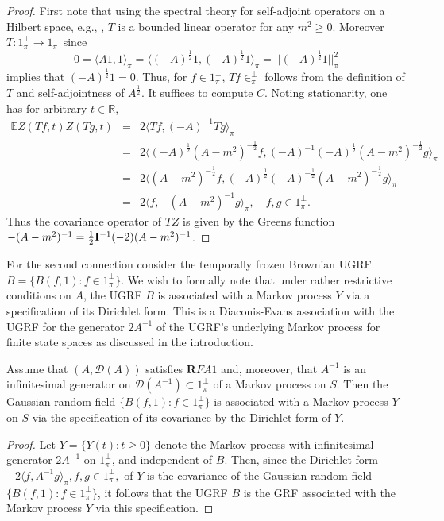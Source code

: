 \documentclass[11pt]{article}
\numberwithin{equation}{section}
\theoremstyle{definition}
\theoremstyle{remark}
\theoremstyle{definition}
\begin{document}
\begin{proof}
First note that using the spectral theory for 
self-adjoint operators on a Hilbert space, e.g., \cite{riesz},
$T$ is a bounded linear operator for any $m^2\ge 0$. Moreover $T:1_\pi^\perp\to1_\pi^\perp$ since 
\begin{equation}0 = \langle A1,1\rangle_\pi = \langle (-A)^{\frac{1}{2}}1,(-A)^{\frac{1}{2}}1\rangle_\pi =||(-A)^{\frac{1}{2}}1||_\pi^2\end{equation}
implies that $(-A)^{\frac{1}{2}}1=0$. Thus, for $f\in1_\pi^\perp$,
$Tf\in_\pi^\perp$ follows from the definition of $T$ and
self-adjointness of $A^{\frac{1}{2}}$.
It suffices to compute $C$. Noting stationarity,
one has for arbitrary $t\in\mathbb{R}$,
\begin{eqnarray}
\mathbb{E}Z(Tf,t)Z(Tg,t) &=& 2\langle Tf,(-A)^{-1}Tg\rangle_\pi\nonumber\\
&=& 2\langle (-A)^{\frac{1}{2}}(A-m^2)^{-\frac{1}{2}}f,(-A)^{-1}(-A)^{\frac{1}{2}}(A-m^2)^{-\frac{1}{2}}g\rangle_\pi\nonumber \\
&=& 2\langle (A-m^2)^{-\frac{1}{2}}f,(-A)^{\frac{1}{2}}(-A)^{-\frac{1}{2}}
(A-m^2)^{-\frac{1}{2}}g\rangle_\pi \nonumber\\
&=& 2\langle f,-(A-m^2)^{-1}g\rangle_\pi, \quad f,g\in1_\pi^\perp.
\end{eqnarray}
Thus the covariance operator of $TZ$ is given by
the Greens function $ -(A-m^2)^{-1} = \frac{1}{2}{\bf I}^{-1}(-2)(A-m^2)^{-1}
$.
\end{proof}


For the second connection consider the temporally frozen Brownian UGRF $B=\{B(f,1):f\in1_\pi^\perp\}$.
We wish to formally note that under rather restrictive conditions on $A$, the
UGRF $B$ is associated with a Markov
process $Y$ via a specification of its Dirichlet form. This is a Diaconis-Evans \cite{DiaconisEvans}
 association with the UGRF for the generator $2A^{-1}$ 
of the UGRF's underlying Markov process  for finite state spaces
 as discussed in the introduction. 

 \begin{thm}\label{dirformthm} Assume that $(A,\mathcal{D}(A))$ satisfies ${\mathbf RFA1}$ and, moreover,
 that $A^{-1}$  is an
  infinitesimal generator on ${\mathcal D}(A^{-1})\subset 1_\pi^\perp$ of
 a Markov process on $S$.  Then the Gaussian random field 
 $\{B(f,1):f\in1_\pi^\perp\}$ is associated  
  with a 
 Markov process $Y$ on $S$
 via the specification
 of its covariance by the Dirichlet form of $Y$.  \end{thm}
 \begin{proof}
 
Let 
$Y=\{Y(t): t\ge 0\}$ denote the Markov process 
 with infinitesimal generator $2A^{-1}$ on $1_\pi^\perp$, and independent of $B$. 
 Then,
since the Dirichlet form $-2\langle f,A^{-1}g\rangle_\pi, f,g\in1_\pi^\perp,$ of $Y$
is the covariance of the Gaussian random field $\{B(f,1): f\in1_\pi^\perp\}$,
it follows that the UGRF $B$ is the GRF associated with the Markov 
process $Y$  via this
specification.  

\end{proof}
\end{document}
